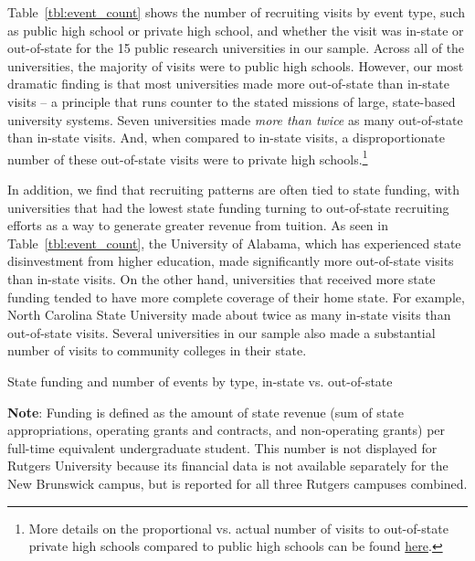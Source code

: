 \documentclass{article}
\begin{document}
Table~\ref{tbl:event_count} shows the number of recruiting visits by event type, such as public high school or private high school, and whether the visit was in-state or out-of-state for the 15 public research universities in our sample. Across all of the universities, the majority of visits were to public high schools. However, our most dramatic finding is that most universities made more out-of-state than in-state visits -- a principle that runs counter to the stated missions of large, state-based university systems. Seven universities made \textit{more than twice} as many out-of-state than in-state visits. And, when compared to in-state visits, a disproportionate number of these out-of-state visits were to private high schools.\footnote{More details on the proportional vs. actual number of visits to out-of-state private high schools compared to public high schools can be found \href{https://emraresearch.org/sites/default/files/2019-03/joyce_report.pdf\#page=34}{here}.} 

In addition, we find that recruiting patterns are often tied to state funding, with universities that had the lowest state funding turning to out-of-state recruiting efforts as a way to generate greater revenue from tuition. As seen in Table~\ref{tbl:event_count}, the University of Alabama, which has experienced state disinvestment from higher education, made significantly more out-of-state visits than in-state visits. On the other hand, universities that received more state funding tended to have more complete coverage of their home state. For example, North Carolina State University made about twice as many in-state visits than out-of-state visits. Several universities in our sample also made a substantial number of visits to community colleges in their state. 

\renewcommand{\arraystretch}{1.5}%
\begin{table}[!ht]
    \caption{State funding and number of events by type, in-state vs. out-of-state}\label{tbl:event_count}
    \vspace{0.5cm}
    \fontsize{6}{7}\selectfont{}
    
    \begin{flushleft}\textbf{Note}: Funding is defined as the amount of state revenue (sum of state appropriations, operating grants and contracts, and non-operating grants) per full-time equivalent undergraduate student. This number is not displayed for Rutgers University because its financial data is not available separately for the New Brunswick campus, but is reported for all three Rutgers campuses combined.\end{flushleft}
\end{table}
\end{document}

